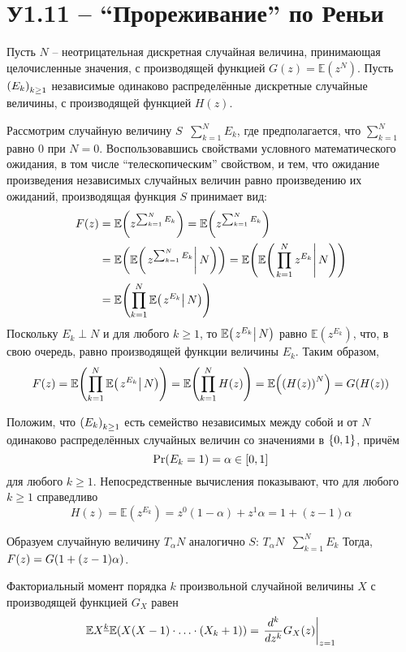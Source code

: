 \documentclass[a4paper]{article}
\let\originalleft\left
\let\originalright\right
\renewcommand{\left}{\mathopen{}\mathclose\bgroup\originalleft}
\renewcommand{\right}{\aftergroup\egroup\originalright}
\newcommand{\obj}[1]{{\left\{ #1 \right \}}}
\newcommand{\clo}[1]{{\left [ #1 \right ]}}
\newcommand{\brac}[1]{{\left ( #1 \right )}}
\newcommand{\induc}[1]{{\left . #1 \right \vert}}
\newcommand{\Ex}[0]{{\mathbb{E}}}
\newcommand{\defn}{{\mathop{\overset{\Delta}{=}}\nolimits}}
\begin{document}


\section{У1.11 -- ``Прореживание'' по Реньи} %
\label{sec:task_1_11}

Пусть $N$ -- неотрицательная дискретная случайная величина, принимающая
целочисленные значения, с производящей функцией $G(z) = \Ex(z^N)$.
Пусть $\brac{E_k}_{k\geq 1}$ независимые одинаково распределённые дискретные
случайные величины, с производящей функцией $H(z)$.

Рассмотрим случайную величину $S \defn \sum_{k=1}^N E_k$, где предполагается,
что $\sum_{k=1}^N$ равно $0$ при $N=0$. Воспользовавшись свойствами условного
математического ожидания, в том числе ``телескопическим'' свойством, и тем,
что ожидание произведения независимых случайных величин равно произведению
их ожиданий, производящая функция $S$ принимает вид:
\begin{align*}
	F(z) &= \Ex\brac{ z^{\sum_{k=1}^N E_k} }
	= \Ex\brac{ z^{\sum_{k=1}^N E_k} } \\
	& = \Ex\brac{ \Ex\brac{\induc{z^{\sum_{k=1}^N E_k} }\,N} }
	= \Ex\brac{ \Ex\brac{\induc{\prod_{k=1}^N z^{E_k} }\,N} } \\
	& = \Ex\brac{ \prod_{k=1}^N \Ex\brac{\induc{z^{E_k} }\,N} }
\end{align*}
Поскольку $E_k\perp N$ и для любого $k\geq 1$, то $\Ex\brac{\induc{z^{E_k} }\,N}$
равно $\Ex(z^{E_k})$, что, в свою очередь, равно производящей функции величины $E_k$.
Таким образом,
\[F(z) = \Ex\brac{ \prod_{k=1}^N \Ex\brac{\induc{z^{E_k} }\,N} }
= \Ex\brac{ \prod_{k=1}^N H(z) } = \Ex\brac{ \brac{H(z)}^N } = G\brac{H(z)}\]

Положим, что $\brac{E_k}_{k\geq 1}$ есть семейство независимых между собой и
от $N$ одинаково распределённых случайных величин со значениями в $\obj{0,1}$,
причём \[\Pr(E_k = 1) = \alpha \in \clo{0,1}\] для любого $k\geq 1$.
Непосредственные вычисления показывают, что для любого $k\geq1$ справедливо
\[H(z) = \Ex(z^{E_k}) = z^0 (1-\alpha) + z^1 \alpha = 1 + (z-1) \alpha\]

Образуем случайную величину $T_\alpha N$ аналогично $S$: $T_\alpha N \defn \sum_{k=1}^N E_k$
Тогда, $F(z) = G\brac{1 + (z-1) \alpha}$.

Факториальный момент порядка $k$ произвольной случайной величины $X$ с
производящей функцией $G_X$ равен
\[ \Ex X^{\underline{k}} \Ex\brac{X(X-1)\cdot\ldots\cdot(X_k+1)} = \induc{\frac{d^k}{dz^k} G_X(z) }_{z=1}\]
\end{document}
